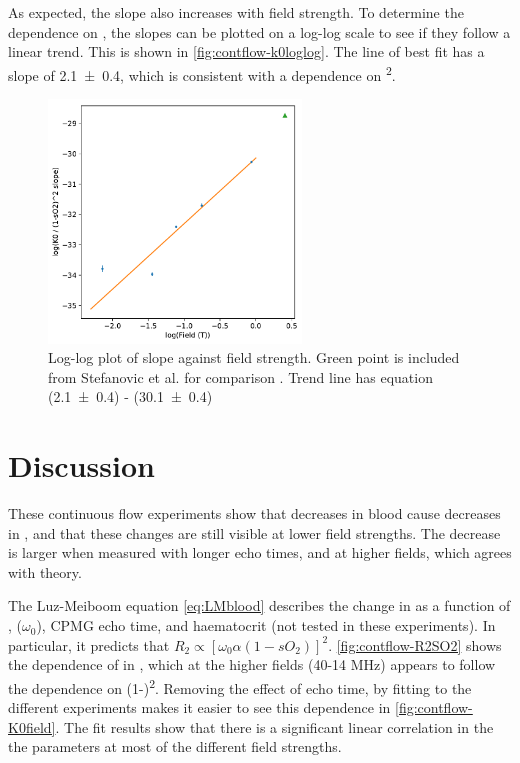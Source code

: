 As expected, the slope also increases with field strength.
To determine the dependence on \Bzero, the slopes can be plotted on a log-log scale to see if they follow a linear trend.
This is shown in \autoref{fig:contflow-k0loglog}.
The line of best fit has a slope of \num{2.1\pm0.4}, which is consistent with a dependence on \Bzero\textsuperscript{2}.
\begin{figure}[tbh]
\centering
\includegraphics[width=0.6\textwidth]{figures/contflow/k0slopefield.pdf}
\caption[\Kzero slope dependence on \Bzero]{Log-log plot of \Kzero slope against field strength. Green point is included from Stefanovic et al. for comparison \cite{StefanovicHumanwholebloodrelaxometry2004}. Trend line has equation (\num{2.1\pm0.4}) \Bzero - (\num{30.1\pm0.4})}
\label{fig:contflow-k0loglog}
\end{figure}

\section{Discussion}
These continuous flow experiments show that decreases in blood \SOtwo cause decreases in \Ttwo, and that these changes are still visible at lower field strengths.
The \Ttwo decrease is larger when measured with longer echo times, and at higher fields, which agrees with theory.

The Luz-Meiboom equation \autoref{eq:LMblood} describes the change in \Ttwo as a function of \SOtwo, \Bzero ($\omega_0$), CPMG echo time, and haematocrit (not tested in these experiments).
In particular, it predicts that $R_2 \propto \left[\omega_0\alpha(1-sO_2)\right]^2$.
\autoref{fig:contflow-R2SO2} shows the dependence of \Rtwo in \SOtwo, which at the higher fields (40-14 MHz) appears to follow the dependence on (1-\SOtwo)\textsuperscript{2}.
Removing the effect of echo time, by fitting \Kzero to the different experiments makes it easier to see this dependence in \autoref{fig:contflow-K0field}.
The fit results show that there is a significant linear correlation in the the parameters at most of the different field strengths.

